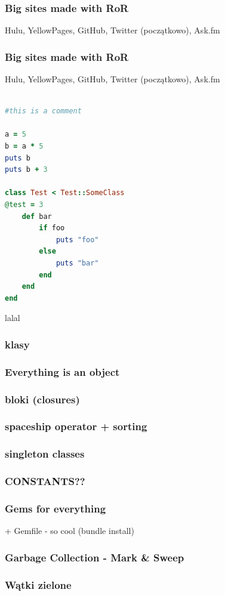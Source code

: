 \documentclass{beamer}
\begin{document}
\begin{frame}[fragile]
\frametitle{Big sites made with RoR}
Hulu, YellowPages, GitHub, Twitter (początkowo), Ask.fm
\end{frame}

\begin{frame}[fragile]
\frametitle{Big sites made with RoR}
Hulu, YellowPages, GitHub, Twitter (początkowo), Ask.fm
\end{frame}

\begin{frame}[fragile]
\begin{lstlisting}[language=Ruby]

#this is a comment

a = 5
b = a * 5
puts b
puts b + 3

class Test < Test::SomeClass
@test = 3
    def bar
        if foo
            puts "foo"
        else
            puts "bar"
        end
    end
end
\end{lstlisting}
lalal
\end{frame}

\begin{frame}[fragile]
\frametitle{klasy}
\end{frame}
\begin{frame}[fragile]
\frametitle{Everything is an object}
\end{frame}
\begin{frame}[fragile]
\frametitle{bloki (closures)}
\end{frame}
\begin{frame}[fragile]
\frametitle{spaceship operator + sorting}
\end{frame}
\begin{frame}[fragile]
\frametitle{singleton classes}
\end{frame}
\begin{frame}[fragile]
\frametitle{CONSTANTS??}
\end{frame}
\begin{frame}[fragile]
\frametitle{Gems for everything}
 + Gemfile - so cool (bundle install)
\end{frame}
\begin{frame}[fragile]
\frametitle{Garbage Collection - Mark \& Sweep}
\end{frame}

\begin{frame}[fragile]
\frametitle{Wątki zielone}
\end{frame}
\end{document}
